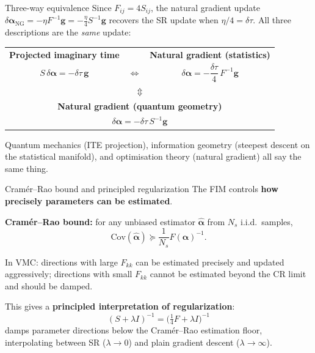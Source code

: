\documentclass[aspectratio=169]{beamer}
\begin{document}
\begin{frame}{Three-way equivalence}
Since \(F_{ij}=4S_{ij}\), the natural gradient update
\(\delta\bm{\alpha}_{\mathrm{NG}}=-\eta F^{-1}\bm{g}=-\frac{\eta}{4}S^{-1}\bm{g}\)
recovers the SR update when \(\eta/4=\delta\tau\).
All three descriptions are the \emph{same} update:

\medskip

\begin{center}
\renewcommand{\arraystretch}{1.8}
\begin{tabular}{c@{\quad}c@{\quad}c}
\textbf{Projected imaginary time} & & \textbf{Natural gradient (statistics)} \\
\(S\,\delta\bm{\alpha}=-\delta\tau\,\bm{g}\)
& \(\boldsymbol{\Longleftrightarrow}\) &
\(\delta\bm{\alpha}=-\dfrac{\delta\tau}{4}\,F^{-1}\bm{g}\) \\[6pt]
\multicolumn{3}{c}{\(\boldsymbol{\Updownarrow}\)} \\[2pt]
\multicolumn{3}{c}{\textbf{Natural gradient (quantum geometry)}} \\
\multicolumn{3}{c}{\(\delta\bm{\alpha}=-\delta\tau\,S^{-1}\bm{g}\)}
\end{tabular}
\end{center}

\smallskip

Quantum mechanics (ITE projection), information geometry (steepest
descent on the statistical manifold), and optimisation theory
(natural gradient) all say the same thing.
\end{frame}

\begin{frame}{Cram\'er--Rao bound and principled regularization}
The FIM controls \textbf{how precisely parameters can be estimated}.

\medskip

\textbf{Cram\'er--Rao bound:} for any unbiased estimator
\(\hat{\bm{\alpha}}\) from \(N_s\) i.i.d.\ samples,
\[
\mathrm{Cov}(\hat{\bm{\alpha}})\succeq\frac{1}{N_s}F(\bm{\alpha})^{-1}.
\]

In VMC: directions with large \(F_{kk}\) can be estimated precisely
and updated aggressively; directions with small \(F_{kk}\) cannot be
estimated beyond the CR limit and should be damped.

\medskip

This gives a \textbf{principled interpretation of regularization}:
\[
(S+\lambda I)^{-1}=\bigl(\tfrac{1}{4}F+\lambda I\bigr)^{-1}
\]
damps parameter directions below the Cram\'er--Rao estimation floor,
interpolating between SR (\(\lambda\to 0\)) and plain gradient
descent (\(\lambda\to\infty\)).
\end{frame}
\end{document}
